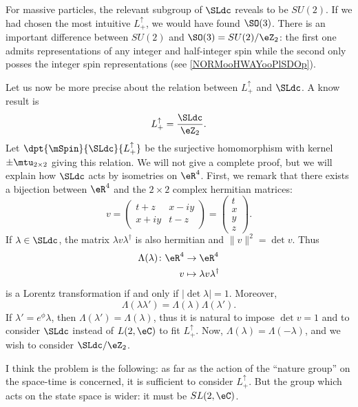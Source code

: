 For massive particles, the relevant subgroup of $\SLdc$ reveals to be $SU(2)$. If we had chosen the most intuitive $L_+^{\uparrow}$, we would have found $\SO(3)$. There is an important difference between $SU(2)$ and $\SO(3)=SU(2)/\eZ_2$: the first one admits representations of any integer and half-integer spin while the second only posses the integer spin representations (see \ref{NORMooHWAYooPlSDOp}).

Let us now be more precise about the relation between $L_+^{\uparrow}$ and $\SLdc$. A know result is
\[
	L_+^{\uparrow}=\frac{\SLdc}{\eZ_2}.
\]
Let $\dpt{\mSpin}{\SLdc}{L_+^{\uparrow}}$ be the surjective homomorphism with kernel $\pm\mtu_{2\times 2}$ giving this relation.
We will not give a complete proof, but we will explain how $\SLdc$ acts by isometries on $\eR^4$. First, we remark that there exists a bijection between $\eR^4$ and the $2\times 2$ complex hermitian matrices:
\begin{equation}
	v=\begin{pmatrix} t+z & x-iy\\x+iy&t-z\end{pmatrix}=\begin{pmatrix}t\\x\\y\\z\end{pmatrix}.
\end{equation}
If $\lambda\in\SLdc$, the matrix $\lambda v\lambda^{\dag}$ is also hermitian and $\|v\|^2=\det v$. Thus
\begin{equation}
	\begin{aligned}
		\Lambda(\lambda)  \colon \eR^4 & \to \eR^4                       \\
		v                              & \mapsto \lambda v\lambda^{\dag}
	\end{aligned}
\end{equation}
is a Lorentz transformation if and only if $|\det\lambda|=1$. Moreover,
\[
	\Lambda(\lambda\lambda')=\Lambda(\lambda)\Lambda(\lambda').
\]
If $\lambda'=e^{\phi}\lambda$, then $\Lambda(\lambda')=\Lambda(\lambda)$, thus it is natural to impose $\det v=1$ and to consider $\SLdc$ instead of $L(2,\eC)$ to fit $L_+^{\uparrow}$. Now, $\Lambda(\lambda)=\Lambda(-\lambda)$, and we wish to consider $\SLdc/\eZ_2$.

I think the problem is the following: as far as the action of the ``nature group''{} on the space-time is concerned, it is sufficient to consider $L_+^{\uparrow}$. But the group which acts on the state space is wider: it must be $SL(2,\eC)$.


